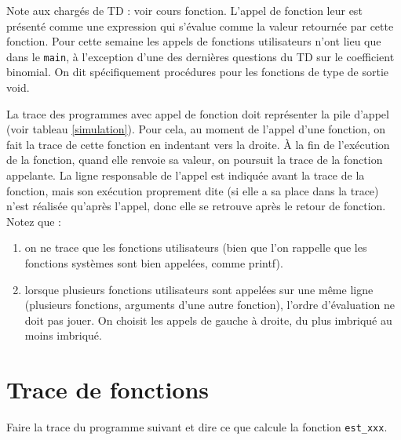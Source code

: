 
\newcommand{\commentaire}[1]{}



\begin{correction}
  Note aux chargés de TD : voir cours fonction. L'appel de fonction
  leur est présenté comme une expression qui s'évalue comme la valeur
  retournée par cette fonction.  Pour cette semaine les appels de
  fonctions utilisateurs n'ont lieu que dans le \verb+main+, à
  l'exception d'une des dernières questions du TD sur le coefficient
  binomial. On dit spécifiquement procédures pour les
  fonctions de type de sortie void.

  La trace des programmes avec appel de fonction doit représenter la
  pile d'appel (voir tableau \ref{simulation}). Pour cela, au moment
  de l'appel d'une fonction, on fait la trace de cette fonction en
  indentant vers la droite. À la fin de l'exécution de la fonction,
  quand elle renvoie sa valeur, on poursuit la trace de la fonction
  appelante. La ligne responsable de l'appel est indiquée avant la
  trace de la fonction, mais son exécution proprement dite (si elle a
  sa place dans la trace) n'est réalisée qu'après l'appel, donc elle
  se retrouve après le retour de fonction. Notez que :
\begin{enumerate}
\item on ne trace que les fonctions utilisateurs (bien que l'on
  rappelle que les fonctions systèmes sont bien appelées, comme
  printf).
\item lorsque plusieurs fonctions utilisateurs sont appelées sur une
  même ligne (plusieurs fonctions, arguments d'une autre fonction),
  l'ordre d'évaluation ne doit pas jouer. On choisit les appels de
  gauche à droite, du plus imbriqué au moins imbriqué.
  \end{enumerate}
\end{correction}

\section{Trace de fonctions}

Faire la trace du programme suivant et dire ce que calcule la fonction \verb+est_xxx+.

{
\footnotesize
}


